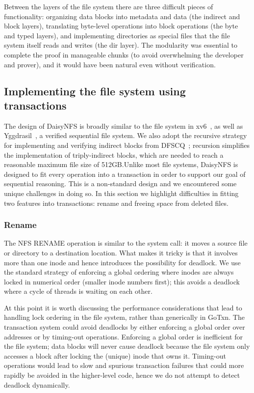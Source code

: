 Between the layers of the file system
there are three difficult pieces of
functionality: organizing data blocks into metadata and data (the
indirect and block layers), translating byte-level operations into
block operations (the byte and typed layers), and implementing
directories as special files that the file system itself reads and
writes (the dir layer). The modularity was essential to complete the proof in
manageable chunks (to avoid overwhelming the developer and prover), and it would
have been natural even without verification.

\subsection{Implementing the file system using transactions}

The design of DaisyNFS is broadly similar to the file system in xv6~\cite{xv6},
as well as Yggdrasil~\cite{sigurbjarnarson:yggdrasil}, a verified sequential
file system. We also adopt the recursive strategy for implementing and
verifying indirect blocks from DFSCQ~\cite{akonradi-meng}; recursion simplifies
the implementation of triply-indirect blocks, which are needed to reach a
reasonable maximum file size of 512GB.\@ Unlike most file systems, DaisyNFS is designed
to fit every operation into a transaction in order to support our goal of
sequential reasoning. This is a non-standard design and we encountered some
unique challenges in doing so. In this section we highlight difficulties in
fitting two features into transactions: rename and freeing space from deleted
files.

\subsubsection{Rename}
\label{sec:dafny:rename}

The NFS RENAME operation is similar to the  system call: it moves a
source file or directory to a destination location. What makes it tricky is that
it involves more than one inode and hence introduces the possibility for
deadlock.
We
use the standard strategy of enforcing a global ordering where inodes are always
locked in numerical order (smaller inode numbers first); this avoids a deadlock
where a cycle of threads is waiting on each other.

At this point it is worth discussing the performance considerations that lead to
handling lock ordering in the file
system, rather than generically in GoTxn. The transaction system could
avoid deadlocks by either enforcing a global order over addresses or by
timing-out operations. Enforcing a global order is inefficient for the file
system; data blocks will never cause deadlock because the file system only
accesses a block after locking the (unique) inode that owns it. Timing-out
operations would lead to slow and spurious transaction failures that could more
rapidly be avoided in the higher-level code, hence we do not attempt to detect
deadlock dynamically.

